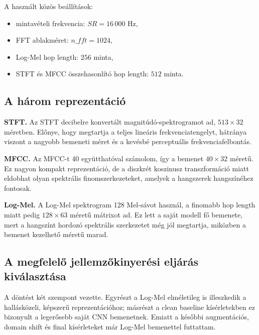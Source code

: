 A használt közös beállítások:
\begin{itemize}
  \item mintavételi frekvencia: $SR = 16\,000$ Hz,
  \item FFT ablakméret: $n\_fft = 1024$,
  \item Log-Mel hop length: $256$ minta,
  \item STFT és MFCC összehasonlító hop length: $512$ minta.
\end{itemize}

\subsection{A három reprezentáció}

\textbf{STFT.} Az STFT decibelre konvertált magnitúdó-spektrogramot ad, $513 \times 32$ méretben. Előnye, hogy megtartja a teljes lineáris frekvenciatengelyt, hátránya viszont a nagyobb bemeneti méret és a kevésbé perceptuális frekvenciafelbontás.

\textbf{MFCC.} Az MFCC-t 40 együtthatóval számolom, így a bemenet $40 \times 32$ méretű. Ez nagyon kompakt reprezentáció, de a diszkrét koszinusz transzformáció miatt eldobhat olyan spektrális finomszerkezeteket, amelyek a hangszerek hangszínéhez fontosak.

\textbf{Log-Mel.} A Log-Mel spektrogram 128 Mel-sávot használ, a finomabb hop length miatt pedig $128 \times 63$ méretű mátrixot ad. Ez lett a saját modell fő bemenete, mert a hangszínt hordozó spektrális szerkezetet még jól megtartja, miközben a bemenet kezelhető méretű marad.

\subsection{A megfelelő jellemzőkinyerési eljárás kiválasztása}
\label{subsec:feature_selection}

A döntést két szempont vezette. Egyrészt a Log-Mel elméletileg is illeszkedik a hallásközeli, képszerű reprezentációhoz; másrészt a clean baseline kísérletekben ez bizonyult a legerősebb saját CNN bemenetnek. Emiatt a későbbi augmentációs, domain shift és final kísérleteket már Log-Mel bemenettel futtattam.

